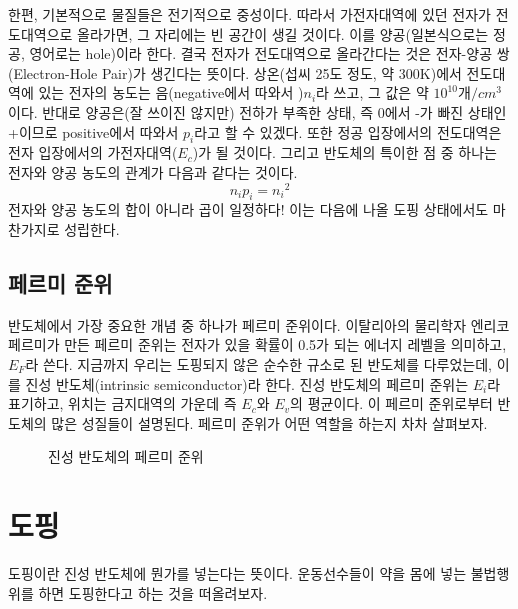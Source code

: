 한편, 기본적으로 물질들은 전기적으로 중성이다. 따라서 가전자대역에 있던 전자가 전도대역으로 올라가면, 그 자리에는 빈 공간이 생길 것이다. 이를 양공(일본식으로는 정공, 영어로는 hole)이라 한다. 결국 전자가 전도대역으로 올라간다는 것은 전자-양공 쌍(Electron-Hole Pair)가 생긴다는 뜻이다.
상온(섭씨 25도 정도, 약 300K)에서 전도대역에 있는 전자의 농도는 음(negative에서 따와서 )$n_i$라 쓰고, 그 값은 약 $10^{10} 개/cm^3$이다. 반대로 양공은(잘 쓰이진 않지만) 전하가 부족한 상태, 즉 0에서 -가 빠진 상태인 +이므로 positive에서 따와서 $p_i$라고 할 수 있겠다.
또한 정공 입장에서의 전도대역은 전자 입장에서의 가전자대역($E_c$)가 될 것이다.
그리고 반도체의 특이한 점 중 하나는 전자와 양공 농도의 관계가 다음과 같다는 것이다.
\begin{equation}
    n_i p_i={n_i}^2\label{eqn:constant concentration product}
\end{equation}
전자와 양공 농도의 합이 아니라 곱이 일정하다! 이는 다음에 나올 도핑 상태에서도 마찬가지로 성립한다.
\subsection{페르미 준위}
반도체에서 가장 중요한 개념 중 하나가 페르미 준위이다. 이탈리아의 물리학자 엔리코 페르미가 만든 페르미 준위는 전자가 있을 확률이 0.5가 되는 에너지 레벨을 의미하고, $E_F$라 쓴다.
지금까지 우리는 도핑되지 않은 순수한 규소로 된 반도체를 다루었는데, 이를 진성 반도체(intrinsic semiconductor)라 한다. 진성 반도체의 페르미 준위는 $E_i$라 표기하고, 위치는 금지대역의 가운데 즉 $E_c$와 $E_v$의 평균이다.
이 페르미 준위로부터 반도체의 많은 성질들이 설명된다. 페르미 준위가 어떤 역할을 하는지 차차 살펴보자.
\begin{figure}[!tbp]
    \centering
    \caption{진성 반도체의 페르미 준위}
\end{figure}
\section{도핑}
도핑이란 진성 반도체에 뭔가를 넣는다는 뜻이다. 운동선수들이 약을 몸에 넣는 불법행위를 하면 도핑한다고 하는 것을 떠올려보자.
